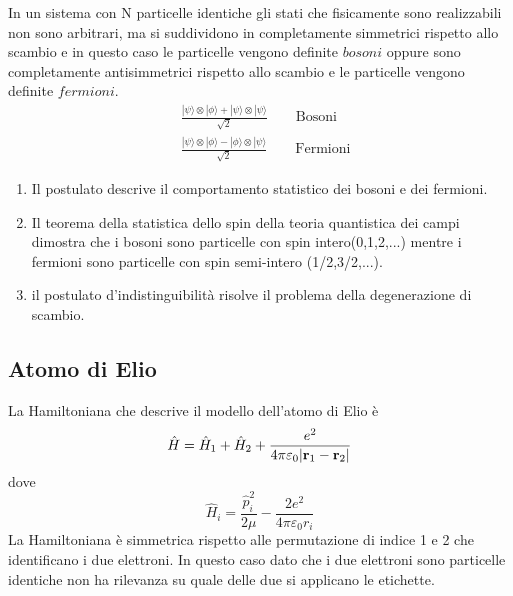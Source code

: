 In un sistema con N particelle identiche  gli stati che fisicamente sono realizzabili non sono arbitrari, ma si suddividono in completamente simmetrici rispetto allo scambio e in questo caso le particelle vengono definite $bosoni$ oppure sono completamente antisimmetrici rispetto allo scambio  e le particelle vengono definite $fermioni$.
\begin{align*}
	& \frac{|\psi \rangle \otimes |\phi \rangle + |\psi \rangle \otimes |\psi \rangle}{\sqrt{2}} \quad \quad \text{Bosoni}\\[0.5cm]
	& \frac{|\psi \rangle \otimes |\phi \rangle - |\phi \rangle \otimes |\psi \rangle }{\sqrt{2}}\quad \quad \text{Fermioni}
\end{align*}
\begin{enumerate}
	\item Il postulato descrive il comportamento statistico dei bosoni e dei fermioni. 
	\item Il teorema della statistica dello spin della teoria quantistica dei campi dimostra che i bosoni sono particelle con spin intero(0,1,2,...) mentre i fermioni sono particelle con spin semi-intero (1/2,3/2,...).
	\item il postulato d'indistinguibilit\`a   risolve il problema della degenerazione di scambio.
\end{enumerate}

\subsection{Atomo di Elio}

La Hamiltoniana che descrive il modello dell'atomo di Elio \`e 
\begin{equation*}
	\hat{H} = \hat{H}_1 + \hat{H}_2 + \frac{e^2}{4 \pi \varepsilon_0|\bold{r}_1 - \bold{r}_2|}
\end{equation*} 
dove 
\begin{equation*}
	\hat{H}_i = \frac{\hat{p}_i^2}{2 \mu} - \frac{2e^2}{4\pi\varepsilon_0 r_i}
\end{equation*}
La Hamiltoniana \`e simmetrica rispetto alle permutazione di indice 1 e 2 che identificano i due elettroni. In questo caso dato che i due elettroni sono particelle identiche non ha rilevanza su quale delle due si applicano le etichette.

